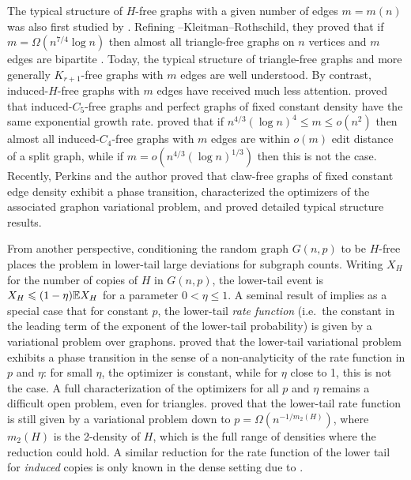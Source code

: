 The typical structure of $H$-free graphs with a given number of edges $m=m(n)$ was also first studied by \citeauthor{promel1996asymptotic}. Refining \erdos{}--Kleitman--Rothschild, they proved that if $m=\Omega(n^{7/4}\log n)$ then almost all triangle-free graphs on $n$ vertices and $m$ edges are bipartite \cite{promel1996asymptotic}. Today, the typical structure of triangle-free graphs \cite{osthus2003densities,steger2005evolution,stark2018probability,jenssen2025evolution} and more generally $K_{r+1}$-free graphs \cite{luczak2000triangle,balogh2009typical,balogh2015independent,balogh2016typical} with $m$ edges are well understood. By contrast, induced-$H$-free graphs with $m$ edges have received much less attention. \citeauthor{bottcher2012perfect} \cite{bottcher2012perfect} proved that induced-$C_5$-free graphs and perfect graphs of fixed constant density have the same exponential growth rate. \citeauthor{morris2024asymmetric} \cite{morris2024asymmetric} proved that if $n^{4/3}(\log n)^4\leq m \leq o(n^2)$ then almost all induced-$C_4$-free graphs with $m$ edges are within $o(m)$ edit distance of a split graph, while if $m=o(n^{4/3}(\log n)^{1/3})$ then this is not the case. Recently, Perkins and the author \cite{perkins2025typical} proved that claw-free graphs of fixed constant edge density exhibit a phase transition, characterized the optimizers of the associated graphon variational problem, and proved detailed typical structure results.

From another perspective, conditioning the \erdosrenyi{} random graph $G(n,p)$ to be $H$-free places the problem in lower-tail large deviations for subgraph counts. Writing $X_H$ for the number of copies of $H$ in $G(n,p)$, the lower-tail event is $X_H\leqslant(1-\eta){\mathbb E} X_H$ for a parameter $0<\eta\leq1$.
A seminal result of \citeauthor{chatterjee2011large} \cite{chatterjee2011large} implies as a special case that for constant $p$, the lower-tail \emph{rate function} (i.e.\ the constant in the leading term of the exponent of the lower-tail probability) is given by a variational problem over graphons.
\citeauthor{zhao2017lower} \cite{zhao2017lower} proved that the lower-tail variational problem exhibits a phase transition in the sense of a non-analyticity of the rate function in $p$ and $\eta$: for small $\eta$, the optimizer is constant, while for $\eta$ close to 1, this is not the case. A full characterization of the optimizers for all $p$ and $\eta$ remains a difficult open problem, even for triangles. \citeauthor{kozma2023lower} \cite{kozma2023lower} proved that the lower-tail rate function is still given by a variational problem down to $p=\Omega(n^{-1/m_2(H)})$, where $m_2(H)$ is the 2-density
of $H$, which is the full range of densities where the reduction could hold. A similar reduction for the rate function of the lower tail for \emph{induced} copies is only known in the dense setting due to \citeauthor{chatterjee2011large}.

